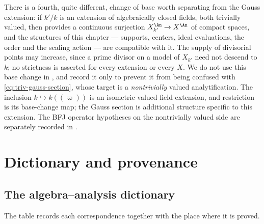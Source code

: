 \begin{remark}
\label{rem:ch32-larger-trivial-field}
There is a fourth, quite different, change of base worth separating from the
Gauss extension: if $k'/k$ is an extension of algebraically closed fields,
both trivially valued, then  provides a
continuous surjection $X_{k'}^{\An}\to X^{\An}$ of compact spaces, and the
structures of this chapter --- supports, centers, ideal evaluations, the
order and the scaling action --- are compatible with it.  The supply of
divisorial points may increase, since a prime divisor on a model of
$X_{k'}$ need not descend to $k$; no strictness is asserted for every
extension or every $X$.  We do not use this base change in
, and record it only to prevent it from being confused with
\eqref{eq:triv-gauss-section}, whose target is a \emph{nontrivially} valued
analytification.  The inclusion $k\hookrightarrow k((\varpi))$ is an isometric valued
field extension, and restriction is its base-change map; the Gauss section
is additional structure specific to this extension.  The BFJ operator
hypotheses on the nontrivially valued side are separately recorded in
.
\end{remark}

\section{Dictionary and provenance}
\label{sec:ch32-dictionary}

\subsection{The algebra--analysis dictionary}
\label{sec:ch32-dict-forward}

The table records each correspondence together with the place where it is
proved.

